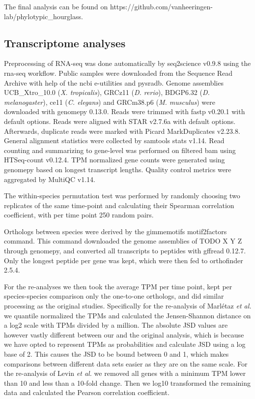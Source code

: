 The final analysis can be found on https://github.com/vanheeringen-lab/phylotypic\_hourglass.

\subsection{Transcriptome analyses}

Preprocessing of RNA-seq was done automatically by seq2science v0.9.8\cite{seq2science} using the rna-seq workflow. Public samples were downloaded from the Sequence Read Archive with help of the ncbi e-utilities and pysradb\cite{Choudhary2019}. Genome assemblies UCB\_Xtro\_10.0 (\textit{X. tropicalis}), GRCz11 (\textit{D. rerio}), BDGP6.32 (\textit{D. melanogaster}), ce11 (\textit{C. elegans}) and GRCm38.p6 (\textit{M. musculus}) were downloaded with genomepy 0.13.0\cite{Frlich2023}. Reads were trimmed with fastp v0.20.1\cite{Chen2018} with default options. Reads were aligned with STAR v2.7.6a\cite{Dobin2012} with default options. Afterwards, duplicate reads were marked with Picard MarkDuplicates v2.23.8\cite{picard}. General alignment statistics were collected by samtools stats v1.14\cite{Danecek2021}. Read counting and summarizing to gene-level was performed on filtered bam using HTSeq-count v0.12.4\cite{Anders2014}. TPM normalized gene counts were generated using genomepy based on longest transcript lengths. Quality control metrics were aggregated by MultiQC v1.14\cite{Ewels2016}. 

The within-species permutation test was performed by randomly choosing two replicates of the same time-point and calculating their Spearman correlation coefficient, with per time point 250 random pairs.

Orthologs between species were derived by the gimmemotifs motif2factors command. This command downloaded the genome assemblies of TODO X Y Z through genomepy\cite{Frlich2023}, and converted all transcripts to peptides with gffread 0.12.7\cite{Pertea2020}. Only the longest peptide per gene was kept, which were then fed to orthofinder 2.5.4\cite{Emms2019}.

For the re-analyses we then took the average TPM per time point, kept per species-species comparison only the one-to-one orthologs, and did similar processing as the original studies. Specifically for the re-analysis of Marl\'etaz \textit{et al.} we quantile normalized\cite{qnorm} the TPMs and calculated the Jensen-Shannon distance on a log2 scale with TPMs divided by a million. The absolute JSD values are however vastly different between our and the original analysis, which is because we have opted to represent TPMs as probabilities and calculate JSD using a log base of 2. This causes the JSD to be bound between 0 and 1, which makes comparisons between different data sets easier as they are on the same scale. For the re-analysis of Levin \textit{et al.} we removed all genes with a minimum TPM lower than 10 and less than a 10-fold change. Then we log10 transformed the remaining data and calculated the Pearson correlation coefficient.


